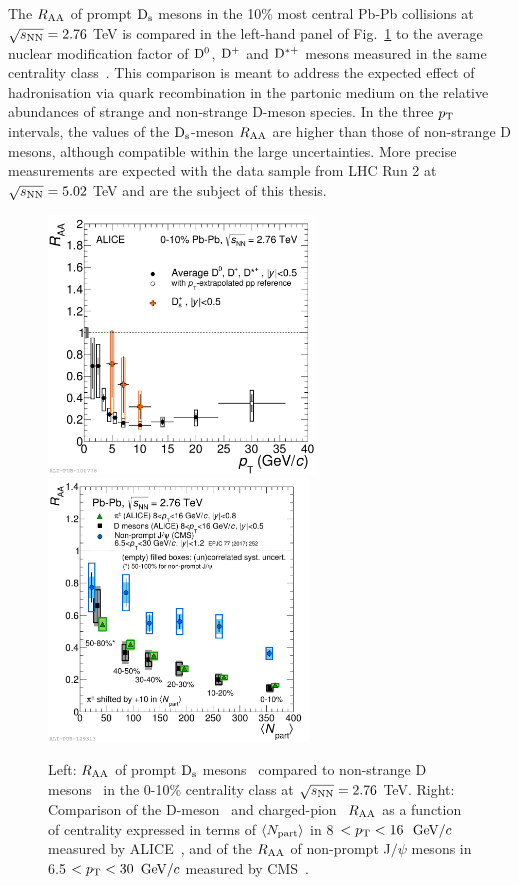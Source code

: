 The $R_{\rm AA}$ of prompt ${\rm D_s}$ mesons in the 10\% most central Pb-Pb collisions 
at $\sqrt{s_{\rm NN}} =  2.76$ TeV is compared in the left-hand panel
of Fig.~\ref{fig:DsD_MassDep} to the average nuclear modification factor of 
${\rm D^0}$, ${\rm D^+}$ and ${\rm D^{*+}}$ mesons measured in the same
centrality class~\cite{Adam:2015sza}. This comparison is meant to 
address the expected effect of hadronisation via quark
recombination in the partonic medium on the relative abundances 
of strange and non-strange D-meson
species. In the three $p_{\rm T}$ intervals, the values of the ${\rm D_s}$-meson $R_{\rm AA}$ 
are higher than those of non-strange D mesons, although 
compatible within the large uncertainties. More precise measurements are 
expected with the data sample from LHC Run 2 at $\sqrt{s_{\rm NN}} = 5.02$ TeV and are the subject of this thesis.\\
\begin{figure}[!ht]
  \centering
    \includegraphics[width=7.1cm]{FigCap2/RAADsD_276.pdf}
    \includegraphics[width=6.9cm]{FigCap2/2017-May-22-RaavsNpart_Dmes8to16_Pions8to16_FinalNonPromptJpsi2017_CC_25042017.pdf}
  \caption{Left: $R_{\rm AA}$ of prompt ${\rm D_s}$ mesons~\cite{Adam:2015jda} compared to non-strange D mesons~\cite{Adam:2015sza} in the 0-10\% centrality class at $\sqrt{s_{\rm NN}} = 2.76$ TeV. Right: Comparison of the D-meson~\cite{Adam:2015nna} and charged-pion~\cite{Abelev:2014laa} $R_{\rm AA}$ as a function of centrality expressed in terms of $\langle N_{\rm part} \rangle $ in \mbox{8 $< p_{\rm T} < 16$ $\mathrm{GeV}/c$} measured by ALICE~\cite{Adam:2015nna}, 
and of the $R_{\rm AA}$ of non-prompt J$/\psi$ mesons in 6.5 $< p_{\rm T} < 30$ $\mathrm{GeV}/c$ measured by CMS~\cite{Khachatryan:2016ypw}. 
}
  \label{fig:DsD_MassDep}
\end{figure}

